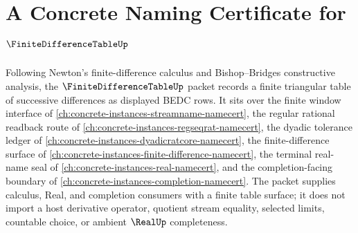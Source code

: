 \chapter{A Concrete Naming Certificate for $\FiniteDifferenceTableUp$}
\label{ch:concrete-instances-finite-difference-table-namecert}

Following Newton's finite-difference calculus and Bishop--Bridges constructive analysis, the $\FiniteDifferenceTableUp$ packet records a finite triangular table of successive differences as displayed BEDC rows. It sits over the finite window interface of \autoref{ch:concrete-instances-streamname-namecert}, the regular rational readback route of \autoref{ch:concrete-instances-regseqrat-namecert}, the dyadic tolerance ledger of \autoref{ch:concrete-instances-dyadicratcore-namecert}, the finite-difference surface of \autoref{ch:concrete-instances-finite-difference-namecert}, the terminal real-name seal of \autoref{ch:concrete-instances-real-namecert}, and the completion-facing boundary of \autoref{ch:concrete-instances-completion-namecert}. The packet supplies calculus, Real, and completion consumers with a finite table surface; it does not import a host derivative operator, quotient stream equality, selected limits, countable choice, or ambient $\RealUp$ completeness.

